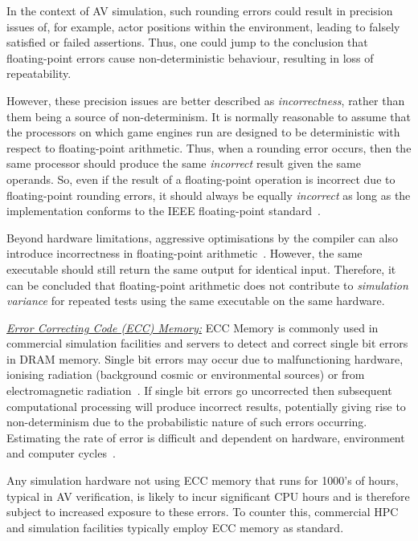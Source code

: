 \documentclass[letterpaper, 10 pt, journal, twoside]{IEEEtran}
\begin{document}
In the context of AV simulation, such rounding errors could result in precision issues of, for example, actor positions within the environment, leading to falsely satisfied or failed assertions.
%
Thus, one could jump to the conclusion that floating-point errors cause non-deterministic behaviour, resulting in loss of repeatability. 

However, these precision issues are better described as \textit{incorrectness}, rather than them being a source of non-determinism. 
%
It is normally reasonable to assume that the processors on which game engines run are designed to be deterministic with respect to floating-point arithmetic. 
%
Thus, when a rounding error occurs, then the same processor should produce the same \textit{incorrect} result given the same operands. 
%
So, even if the result of a floating-point operation is incorrect due to floating-point rounding errors, it should always 
be equally \textit{incorrect} as long as the implementation conforms to the IEEE floating-point standard~\cite{8766229}.

Beyond hardware limitations, aggressive optimisations by the compiler can also introduce incorrectness in floating-point arithmetic~\cite{llvm-floating-point}. However, the same executable should still return the same output for identical input. 
%
Therefore, it can be concluded that floating-point arithmetic does not contribute to \textit{simulation variance} for repeated tests using the same executable on the same hardware.


\noindent\underline{\textit{Error Correcting Code (ECC) Memory:}}
ECC Memory is commonly used in commercial simulation facilities and servers to detect and correct single bit errors in DRAM memory. Single bit errors may occur due to malfunctioning hardware, ionising radiation (background cosmic or environmental sources) or from electromagnetic radiation~\cite{dodd2003basic}. If single bit errors go uncorrected then subsequent computational processing will produce incorrect results, potentially giving rise to non-determinism due to the probabilistic nature of such errors occurring. Estimating the rate of error is difficult and dependent on hardware, environment and computer cycles~\cite{mielke2008bit}.

Any simulation hardware not using ECC memory that runs for 1000's of hours, typical in AV verification, is likely to incur significant CPU hours and is therefore subject to increased exposure to these errors. To counter this, commercial HPC and simulation facilities typically employ ECC memory as standard.
\end{document}
